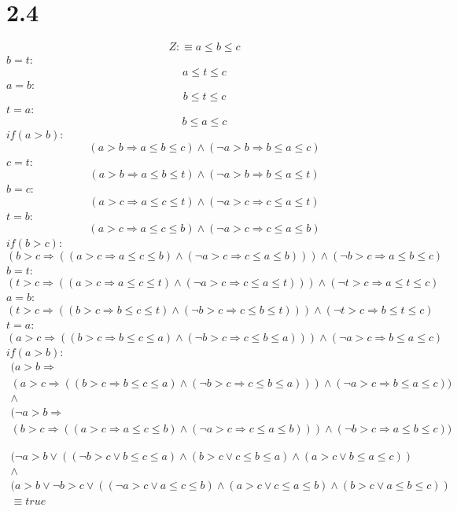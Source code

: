\documentclass{article}
\begin{document}
\section*{2.4}

$$ Z:\equiv a \le b \le c $$
$b=t$:
$$ a \le t \le c $$
$a=b$:
$$ b \le t \le c $$
$t=a$:
$$ b \le a \le c $$
$if(a>b)$:
$$ (a>b \Rightarrow a \le b \le c) \land (\neg a>b \Rightarrow b \le a \le c) $$
$c=t$:
$$ (a>b \Rightarrow a \le b \le t) \land (\neg a>b \Rightarrow b \le a \le t) $$
$b=c$:
$$ (a>c \Rightarrow a \le c \le t) \land (\neg a>c \Rightarrow c \le a \le t) $$
$t=b$:
$$ (a>c \Rightarrow a \le c \le b) \land (\neg a>c \Rightarrow c \le a \le b) $$
$if(b>c)$:
$$ (b>c \Rightarrow ((a>c \Rightarrow a \le c \le b) \land (\neg a>c \Rightarrow c \le a \le b))) \land (\neg b>c \Rightarrow a \le b \le c) $$
$b=t$:
$$ (t>c \Rightarrow ((a>c \Rightarrow a \le c \le t) \land (\neg a>c \Rightarrow c \le a \le t))) \land (\neg t>c \Rightarrow a \le t \le c) $$
$a=b$:
$$ (t>c \Rightarrow ((b>c \Rightarrow b \le c \le t) \land (\neg b>c \Rightarrow c \le b \le t))) \land (\neg t>c \Rightarrow b \le t \le c) $$
$t=a$:
$$ (a>c \Rightarrow ((b>c \Rightarrow b \le c \le a) \land (\neg b>c \Rightarrow c \le b \le a))) \land (\neg a>c \Rightarrow b \le a \le c) $$
$if(a>b)$:
\begin{equation}
	\begin{array}{l}
	(a>b \Rightarrow \\
	(a>c \Rightarrow ((b>c \Rightarrow b \le c \le a) \land (\neg b>c \Rightarrow c \le b \le a))) \land (\neg a>c \Rightarrow b \le a \le c)) \\
	\land \\
	(\neg a>b \Rightarrow \\
	(b>c \Rightarrow ((a>c \Rightarrow a \le c \le b) \land (\neg a>c \Rightarrow c \le a \le b))) \land (\neg b>c \Rightarrow a \le b \le c))
	\end{array}
\end{equation}

\begin{equation}
	\begin{array}{l}
	(\neg a>b \lor ((\neg b>c \lor b\le c \le a) \land (b>c \lor c \le b \le a) \land (a>c \lor b \le a \le c)) \\
	\land \\
	(a>b \lor \neg b>c \lor ((\neg a>c \lor a \le c \le b) \land (a>c \lor c \le a \le b) \land (b>c \lor a \le b \le c)) \\
	\equiv true
	\end{array}
\end{equation}
\end{document}

